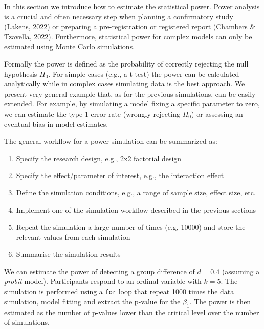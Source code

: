 \documentclass[
  man, mask,floatsintext]{apa6}
\providecommand{\tightlist}{%
  \setlength{\itemsep}{0pt}\setlength{\parskip}{0pt}}
\begin{document}
In this section we introduce how to estimate the statistical power. Power analysis is a crucial and often necessary step when planning a confirmatory study (Lakens, 2022) or preparing a pre-registration or registered report (Chambers \& Tzavella, 2022). Furthermore, statistical power for complex models can only be estimated using Monte Carlo simulations.

Formally the power is defined as the probability of correctly rejecting the null hypothesis \(H_0\). For simple cases (e.g., a t-test) the power can be calculated analytically while in complex cases simulating data is the best approach. We present very general example that, as for the previous simulations, can be easily extended. For example, by simulating a model fixing a specific parameter to zero, we can estimate the type-1 error rate (wrongly rejecting \(H_0\)) or assessing an eventual bias in model estimates.

The general workflow for a power simulation can be summarized as:

\begin{enumerate}
\def\labelenumi{\arabic{enumi}.}
\tightlist
\item
  Specify the research design, e.g., 2x2 factorial design
\item
  Specify the effect/parameter of interest, e.g., the interaction effect
\item
  Define the simulation conditions, e.g., a range of sample size, effect size, etc.
\item
  Implement one of the simulation workflow described in the previous sections
\item
  Repeat the simulation a large number of times (e.g, 10000) and store the relevant values from each simulation
\item
  Summarise the simulation results
\end{enumerate}

We can estimate the power of detecting a group difference of \(d = 0.4\) (assuming a \emph{probit} model). Participants respond to an ordinal variable with \(k = 5\). The simulation is performed using a \texttt{for} loop that repeat 1000 times the data simulation, model fitting and extract the p-value for the \(\beta_1\). The power is then estimated as the number of p-values lower than the critical level over the number of simulations.

\scriptsize
\end{document}
